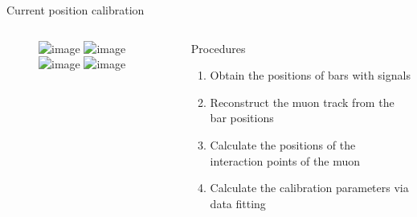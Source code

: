 \documentclass{ikpKoeln}
\begin{document}
\begin{frame}[t]{Current position calibration}
	\vspace*{-2em}
	\begin{columns}[t]
		\begin{column}{0.45 \textwidth}
			\begin{figure}[t]
				\includegraphics<1>[width = \textwidth]{R3BCon2024GSI/side_view1.png}
				\includegraphics<2>[width = \textwidth]{R3BCon2024GSI/side_view2.png}
				\includegraphics<3-4>[width = \textwidth]{R3BCon2024GSI/side_view3.png}
				\includegraphics<5>[width = \textwidth]{R3BCon2024GSI/side_view4.png}
			\end{figure}
		\end{column}
		\begin{column}{0.45 \textwidth}
			\begin{exampleblock}{\small Procedures}
				\small
				\begin{enumerate}
					\setlength\itemsep{0em}
					\small
					\item<1-> Obtain the positions of bars with signals
					\item<2-> Reconstruct the muon track from the bar positions
					\item<3-> Calculate the positions of the interaction points of the muon
					\item<4-> Calculate the calibration parameters via data fitting
				\end{enumerate}
			\end{exampleblock}
		\end{column}
	\end{columns}
\end{frame}
\end{document}
